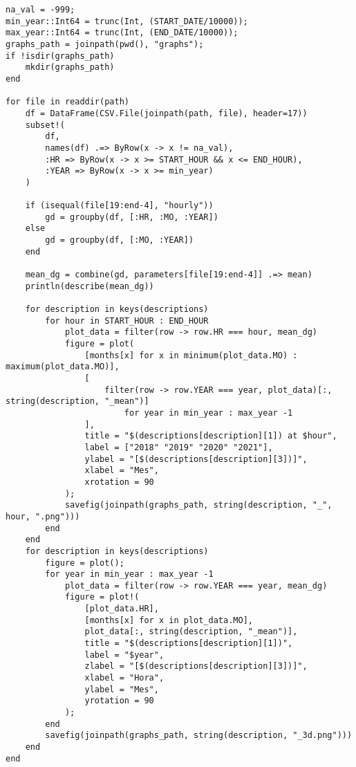 \begin{lstlisting}
na_val = -999;
min_year::Int64 = trunc(Int, (START_DATE/10000));
max_year::Int64 = trunc(Int, (END_DATE/10000));
graphs_path = joinpath(pwd(), "graphs");
if !isdir(graphs_path)
	mkdir(graphs_path)
end

for file in readdir(path)
	df = DataFrame(CSV.File(joinpath(path, file), header=17))
	subset!(
		df,
		names(df) .=> ByRow(x -> x != na_val),
		:HR => ByRow(x -> x >= START_HOUR && x <= END_HOUR),
		:YEAR => ByRow(x -> x >= min_year)
	)

	if (isequal(file[19:end-4], "hourly"))
		gd = groupby(df, [:HR, :MO, :YEAR])
	else
		gd = groupby(df, [:MO, :YEAR])
	end

	mean_dg = combine(gd, parameters[file[19:end-4]] .=> mean)
	println(describe(mean_dg))

	for description in keys(descriptions)
		for hour in START_HOUR : END_HOUR
			plot_data = filter(row -> row.HR === hour, mean_dg)
			figure = plot(
				[months[x] for x in minimum(plot_data.MO) : maximum(plot_data.MO)],
				[
					filter(row -> row.YEAR === year, plot_data)[:, string(description, "_mean")]
						for year in min_year : max_year -1
				],
				title = "$(descriptions[description][1]) at $hour",
				label = ["2018" "2019" "2020" "2021"],
				ylabel = "[$(descriptions[description][3])]",
				xlabel = "Mes",
				xrotation = 90
			);
			savefig(joinpath(graphs_path, string(description, "_", hour, ".png")))
		end
	end
	for description in keys(descriptions)
		figure = plot();
		for year in min_year : max_year -1
			plot_data = filter(row -> row.YEAR === year, mean_dg)
			figure = plot!(
				[plot_data.HR],
				[months[x] for x in plot_data.MO],
				plot_data[:, string(description, "_mean")],
				title = "$(descriptions[description][1])",
				label = "$year",
				zlabel = "[$(descriptions[description][3])]",
				xlabel = "Hora",
				ylabel = "Mes",
				yrotation = 90
			);
		end
		savefig(joinpath(graphs_path, string(description, "_3d.png")))
	end
end
\end{lstlisting}

